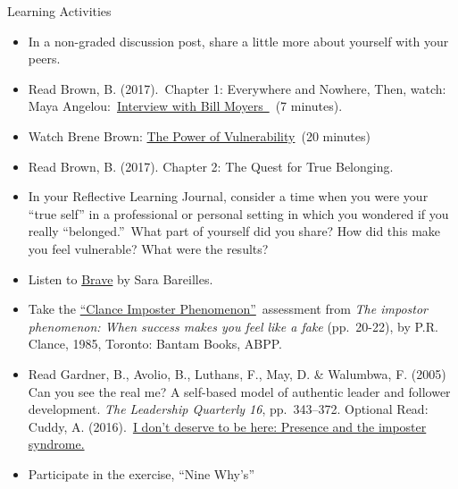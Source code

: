 \documentclass[
]{book}
\providecommand{\tightlist}{%
  \setlength{\itemsep}{0pt}\setlength{\parskip}{0pt}}
\begin{document}
\begin{reflect}
{Learning Activities}

\begin{itemize}
\tightlist
\item
  In a non-graded discussion post, share a little more about yourself with your peers.\\
\item
  Read Brown, B. (2017).~Chapter 1: Everywhere and Nowhere, Then, watch: Maya Angelou:~\href{http://billmoyers.com/content/conversation-maya-angelou/}{Interview with Bill Moyers~}~(7 minutes).\\
\item
  Watch Brene Brown: \href{https://www.ted.com/talks/brene_brown_on_vulnerability}{The Power of Vulnerability}~(20 minutes)\\
\item
  Read Brown, B. (2017). Chapter 2: The Quest for True Belonging.\\
\item
  In your Reflective Learning Journal, consider a time when you were your ``true self'' in a professional or personal setting in which you wondered if you really ``belonged.''~What part of yourself did you share? How did this make you feel vulnerable? What were the results?\\
\item
  Listen to \href{https://www.youtube.com/watch?v=QUQsqBqxoR4}{Brave} by Sara Bareilles.\\
\item
  Take the \href{https://paulineroseclance.com/pdf/IPscoringtest.pdf}{``Clance Imposter Phenomenon''}~assessment from \emph{The impostor phenomenon: When success makes you feel like a fake} (pp.~20-22), by P.R. Clance, 1985, Toronto: Bantam Books, ABPP.\\
\item
  Read Gardner, B., Avolio, B., Luthans, F., May, D. \& Walumbwa, F. (2005) Can you see the real me? A self-based model of authentic leader and follower development. \emph{The Leadership Quarterly 16}, pp.~343--372. Optional Read: Cuddy, A. (2016).~\href{https://leanin.org/news-inspiration/overcoming-imposter-syndrome-to-reveal-your-presence}{I don't deserve to be here: Presence and the imposter syndrome.}\\
\item
  Participate in the exercise, ``Nine Why's''
\end{itemize}
\end{reflect}
\end{document}

